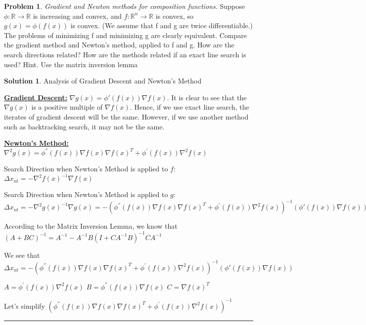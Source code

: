 \documentclass{article}
\theoremstyle{definition}
\newtheorem{problem}{Problem}
\def\fline{\rule{0.75\linewidth}{0.5pt}}
\newcommand{\finishline}{\begin{center}\fline\end{center}}
\newtheorem*{solution*}{Solution}
\newenvironment{solution}{\begin{solution*}}{{\finishline} \end{solution*}}
\begin{document}
\begin{problem} \textit{Gradient and Newton methods for composition functions.} Suppose $\phi: \mathbb{R} \rightarrow \mathbb{R}$ is increasing and convex, and $f: \mathbb{R}^n \rightarrow \mathbb{R}$ is convex, so $g(x) = \phi(f(x))$ is convex. (We assume that f and g are twice differentiable.) The problems of minimizing f and minimizing g are clearly equivalent. \newline 
Compare the gradient method and Newton’s method, applied to f and g. How are the
search directions related? How are the methods related if an exact line search is used?
Hint. Use the matrix inversion lemma

\begin{solution} Analysis of Gradient Descent and Newton's Method

\textbf{\underline{Gradient Descent:}} \newline 
    $\nabla g(x) = \phi'(f(x)) \nabla f(x)$. It is clear to see that the $\nabla g(x)$ is a positive multiple of $\nabla f(x)$. Hence, if we use exact line search, the iterates of gradient descent will be the same. However, if we use another method such as backtracking search, it may not be the same. 

\textbf{\underline{Newton's Method:}} \newline 
$\nabla^2g(x) = \phi^{''}(f(x)) \nabla f(x) \nabla f(x)^T + \phi^{'}(f(x))\nabla^2f(x)$

Search Direction when Newton's Method is applied to $f$: $\Delta x_{nt} = -\nabla^2f(x)^{-1} \nabla f(x)$

Search Direction when Newton's Method is applied to $g$: $\Delta x_{nt} = -\nabla^2g(x)^{-1} \nabla g(x) = -(\phi^{''}(f(x)) \nabla f(x) \nabla f(x)^T + \phi^{'}(f(x))\nabla^2f(x))^{-1} ( \phi'(f(x)) \nabla f(x))$


According to the Matrix Inversion Lemma, we know that $(A + BC)^{-1} = A^{-1} - A^{-1}B (I + CA^{-1}B)^{-1} CA^{-1}$ \newline 

We see that $\Delta x_{nt} = -(\phi^{''}(f(x)) \nabla f(x) \nabla f(x)^T + \phi^{'}(f(x))\nabla^2f(x))^{-1} ( \phi'(f(x)) \nabla f(x))$ \newline 

$A = \phi^{'}(f(x))\nabla^2f(x)$ \newline 
$B = \phi^{''}(f(x))  \nabla f(x)$ \newline 
$C = \nabla f(x)^T$

Let's simplify $(\phi^{''}(f(x)) \nabla f(x) \nabla f(x)^T + \phi^{'}(f(x))\nabla^2f(x))^{-1}$ \newline 


\end{solution}
\end{problem}
\end{document}
